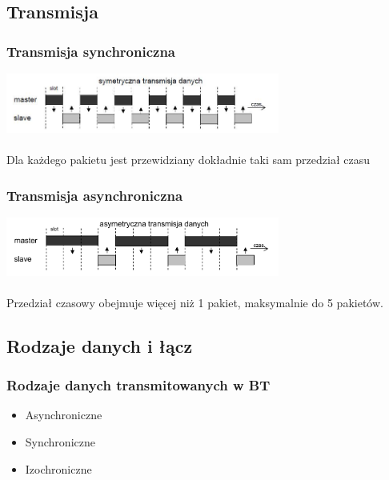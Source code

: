 \subsection{Transmisja}
\subsubsection{Transmisja synchroniczna}
\includegraphics[width=9cm]{./wyklady/bluetooth_2.jpg}\\\\
Dla każdego pakietu jest przewidziany dokładnie taki sam przedział czasu
\subsubsection{Transmisja asynchroniczna}
\includegraphics[width=9cm]{./wyklady/Rysunek03.pdf}\\\\
Przedział czasowy obejmuje więcej niż 1 pakiet, maksymalnie do 5 pakietów.

\subsection{Rodzaje danych i łącz}
\subsubsection{Rodzaje danych transmitowanych w BT}
\begin{itemize}
	\item Asynchroniczne
	\item Synchroniczne
	\item Izochroniczne
\end{itemize}

